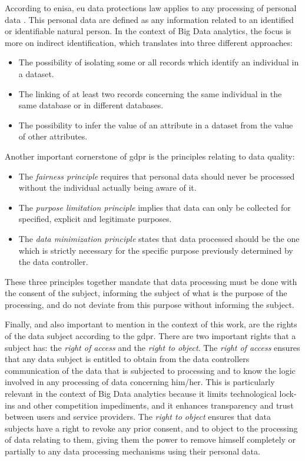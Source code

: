  According to \ac{enisa}, \ac{eu} data protections law applies to any processing of personal data \cite{DAcquisto2015}. This personal data are defined as any information related to an identified or identifiable natural person. In the context of Big Data analytics, the focus is more on indirect identification, which translates into three different approaches:

\begin{itemize}
	\item The possibility of isolating some or all records which identify an individual in a dataset.
	\item The linking of at least two records concerning the same individual in the same database or in different databases.
	\item The possibility to infer the value of an attribute in a dataset from the value of other attributes.
\end{itemize}


Another important cornerstone of \ac{gdpr} is the principles relating to data quality:

\begin{itemize}

    \item The \textit{fairness principle} requires that personal data should never be processed without the individual actually being aware of it.

    \item The \textit{purpose limitation principle} implies that data can only be collected for specified, explicit and legitimate purposes.

    \item The \textit{data minimization principle} states that data processed should be the one which is strictly necessary for the specific purpose previously determined by the data controller.
\end{itemize}


These three principles together mandate that data processing must be done with the consent of the subject, informing the subject of what is the purpose of the processing, and do not deviate from this purpose without informing the subject.

Finally, and also important to mention in the context of this work, are the rights of the data subject according to the \ac{gdpr}. There are two important rights that a subject has: the \textit{right of access} and the \textit{right to object}.
The \textit{right of access} ensures that any data subject is entitled to obtain from the data controllers communication of the data that is subjected to processing and to know the logic involved in any processing of data concerning him/her.
This is particularly relevant in the context of Big Data analytics because it limits technological lock-ins and other competition impediments, and it enhances transparency and trust between users and service providers.
The \textit{right to object} ensures that data subjects have a right to revoke any prior consent, and to object to the processing of data relating to them, giving them the power to remove himself completely or partially to any data processing mechanisms using their personal data.


